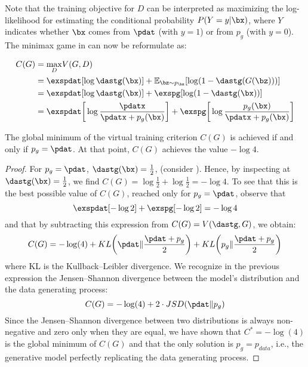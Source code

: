 \noindent Note that the training objective for $D$ can be interpreted as maximizing the log-likelihood for estimating the conditional probability $P(Y=y|\bx)$, where $Y$ indicates whether $\bx$ comes from $\pdat$ (with $y=1$) or from $p_g$ (with $y=0$). The minimax game in %
can now be reformulate as:

\begin{align*}
	C(G) &= \underset{D}{\max}V(G,D)\\
	&= \exspdat[\log \dastg(\bx)] + \mathbb{E}_{\bz\sim p_{\bz}}[\log(1-\dastg(G(\bz)))]\\ %
	&= \exspdat[\log \dastg(\bx)] + \exspg[\log(1-\dastg(\bx))]\\
	&= \exspdat\bigg[\log\frac{\pdatx}{\pdatx+p_g(\bx)}\bigg]+\exspg\bigg[\log\frac{p_g(\bx)}{\pdatx+p_g(\bx)}\bigg]
\end{align*}

\begin{theorem}
	The global minimum of the virtual training criterion $C(G)$ is achieved if and only if $p_g=\pdat$. At that point, $C(G)$ achieves the value $-\log4$.
\end{theorem}

\begin{proof}
	For $p_g=\pdat$, $\dastg(\bx)=\frac{1}{2}$, (consider%
	). Hence, by inspecting %
	at $\dastg(\bx)=\frac{1}{2}$, we find $C(G)=\log\frac{1}{2}+\log\frac{1}{2}=-\log4$. To see that this is the best possible value of $C(G)$, reached only for $p_g=\pdat$, observe that
	\begin{equation*}
		\exspdat[-\log2]+\exspg[-\log2]=-\log4
	\end{equation*}
	and that by subtracting this expression from $C(G)=V(\dastg,G)$, we obtain:
	\begin{equation}
		C(G)=-\log(4)+KL\bigg(\pdat\Vert\frac{\pdat+p_g}{2}\bigg)+KL\bigg(p_g\Vert\frac{\pdat+p_g}{2}\bigg)
	\end{equation}
	where KL is the Kullback–Leibler divergence. We recognize in the previous expression the Jensen–Shannon divergence between the model’s distribution and the data generating process:
	\begin{equation}
		C(G)=-\log(4)+2\cdot JSD(\pdat\Vert p_g)
	\end{equation}
	Since the Jensen–Shannon divergence between two distributions is always non-negative and zero only when they are equal, we have shown that $C^{\ast}=-\log(4)$ is the global minimum of $C(G)$ and that the only solution is $p_g=p_{data}$, i.e., the generative model perfectly replicating the data generating process.
\end{proof}

